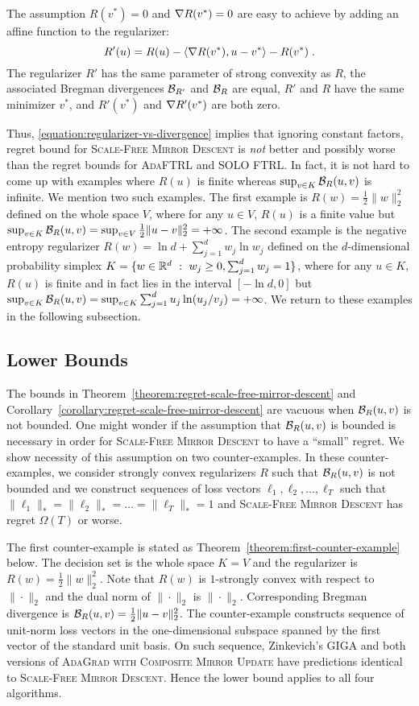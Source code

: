 The assumption $R(v^*) = 0$ and $\nabla R(v^*) = 0$
are easy to achieve by adding an affine function to the regularizer:
$$
R'(u) = R(u) - \langle \nabla R(v^*), u - v^* \rangle - R(v^*) \; .
$$
The regularizer $R'$ has the same parameter of strong convexity as $R$, the
associated Bregman divergences $\mathcal{B}_{R'}$ and $\mathcal{B}_{R}$ are equal, $R'$ and
$R$ have the same minimizer $v^*$, and $R'(v^*)$ and $\nabla R'(v^*)$ are
both zero.

Thus, \eqref{equation:regularizer-vs-divergence} implies that ignoring constant
factors, regret bound for \textsc{Scale-Free Mirror Descent} is \emph{not}
better and possibly worse than the regret bounds for \textsc{AdaFTRL} and
\textsc{SOLO FTRL}.  In fact, it is not hard to come up with examples where
$R(u)$ is finite whereas $\sup_{v \in K} \mathcal{B}_R(u,v)$ is infinite. We mention
two such examples. The first example is $R(w) = \frac{1}{2}\|w\|_2^2$ defined
on the whole space $V$, where for any $u \in V$, $R(u)$ is a finite value but
$\sup_{v \in K} \mathcal{B}_R(u,v) = \sup_{v \in V} \frac{1}{2}\|u-v\|_2^2 =
+\infty$. The second example is the negative entropy regularizer $R(w) = \ln d
+ \sum_{j=1}^d w_j \ln w_j$ defined on the $d$-dimensional probability simplex
$K = \{ w \in \mathbb{R}^d ~:~ w_j \ge 0, \sum_{j=1}^d w_j = 1 \}$, where for any $u
\in K$, $R(u)$ is finite and in fact lies in the interval $[-\ln d, 0]$ but
$\sup_{v \in K} \mathcal{B}_R(u,v) = \sup_{v \in K} \sum_{j=1}^d u_j \ln(u_j/v_j) = +
\infty$. We return to these examples in the following subsection.

\subsection{Lower Bounds}

The bounds in Theorem~\ref{theorem:regret-scale-free-mirror-descent} and
Corollary~\ref{corollary:regret-scale-free-mirror-descent} are vacuous when
$\mathcal{B}_R(u,v)$ is not bounded. One might wonder if the assumption that
$\mathcal{B}_R(u,v)$ is bounded is necessary in order for \textsc{Scale-Free Mirror Descent}
to have a ``small'' regret. We show necessity of this assumption on
two counter-examples.  In these
counter-examples, we consider strongly convex regularizers $R$ such that
$\mathcal{B}_R(u,v)$ is not bounded and we construct sequences of loss vectors
$\ell_1, \ell_2, \dots, \ell_T$ such that $\|\ell_1\|_* = \|\ell_2\|_* = \dots
= \|\ell_T\|_* = 1$ and \textsc{Scale-Free Mirror Descent} has regret
$\Omega(T)$ or worse.

The first counter-example is stated as
Theorem~\ref{theorem:first-counter-example} below. The decision set is the
whole space $K=V$ and the regularizer is $R(w) = \frac{1}{2}\|w\|_2^2$. Note
that $R(w)$ is $1$-strongly convex with respect to $\|\cdot\|_2$ and the dual
norm of $\|\cdot\|_2$ is $\|\cdot\|_2$. Corresponding Bregman divergence is
$\mathcal{B}_R(u,v) = \frac{1}{2}\|u-v\|_2^2$. The counter-example constructs
sequence of unit-norm loss vectors in the one-dimensional subspace spanned by
the first vector of the standard unit basis.  On such sequence, Zinkevich's
\textsc{GIGA} and both versions of \textsc{AdaGrad with Composite Mirror
Update} have predictions identical to \textsc{Scale-Free Mirror Descent}. Hence
the lower bound applies to all four algorithms.

